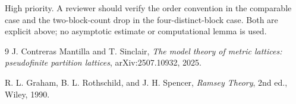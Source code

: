 \documentclass[11pt]{article}
\begin{document}
High priority.  A reviewer should verify the order convention in the
comparable case and the two-block-count drop in the four-distinct-block case.
Both are explicit above; no asymptotic estimate or computational lemma is used.

\enlargethispage{3\baselineskip}
\small
\begin{thebibliography}{9}
J. Contreras Mantilla and T. Sinclair,
\emph{The model theory of metric lattices: pseudofinite partition lattices},
arXiv:2507.10932, 2025.

R. L. Graham, B. L. Rothschild, and J. H. Spencer,
\emph{Ramsey Theory}, 2nd ed., Wiley, 1990.
\end{thebibliography}
\end{document}
